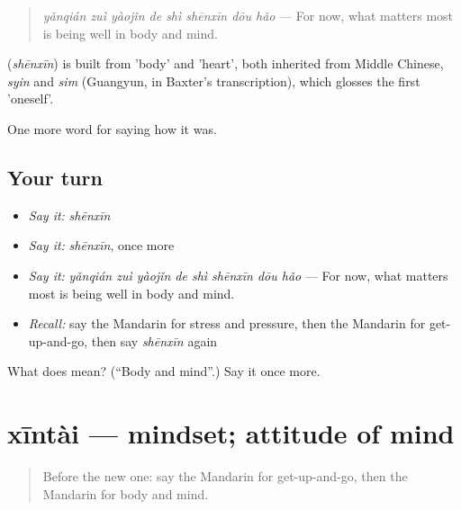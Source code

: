 \begin{quote}
\textbf{} \emph{yǎnqián zuì yàojǐn de shì shēnxīn dōu hǎo} — For now, what matters most is being well in body and mind.
\end{quote}

\begin{cousinweb}
\textbf{} (\emph{shēnxīn}) is built from  'body' and  'heart', both inherited from Middle Chinese, \emph{syin} and \emph{sim} (Guangyun, in Baxter's transcription), which glosses the first 'oneself'.
\end{cousinweb}

\begin{grammarlens}[title={What you've built}]
One more word for saying how it was.
\end{grammarlens}

\subsection*{Your turn}
\begin{itemize}
\raggedright
  \item \emph{Say it:} \emph{shēnxīn}
  \item \emph{Say it:} \emph{shēnxīn}, once more
  \item \emph{Say it:} \emph{yǎnqián zuì yàojǐn de shì shēnxīn dōu hǎo} — For now, what matters most is being well in body and mind.
  \item \emph{Recall:} say the Mandarin for stress and pressure, then the Mandarin for get-up-and-go, then say \emph{shēnxīn} again
\end{itemize}

\begin{tcolorbox}[breakable,colback=teal!4,colframe=teal!35!black,title={Before you move on}]
What does  mean? (\textquotedblleft{}Body and mind\textquotedblright{}.) Say it once more.
\end{tcolorbox}
\section[xīntài]{xīntài — mindset; attitude of mind}

\label{lesson:ZH-C485-xintai}



\begin{quote}
Before the new one: say the Mandarin for get-up-and-go, then the Mandarin for body and mind.
\end{quote}

